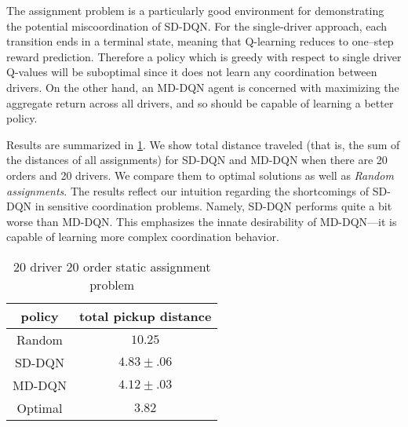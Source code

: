 The assignment problem is a particularly good environment for demonstrating the potential miscoordination of SD-DQN. For the single-driver approach, each transition ends in a terminal state, meaning that Q-learning reduces to one--step reward prediction. Therefore a policy which is greedy with respect to single driver Q-values will be suboptimal since it does not learn any coordination between drivers. On the other hand, an MD-DQN agent is concerned with maximizing the aggregate return across all drivers, and so should be capable of learning a better policy.
% 
% 

Results are summarized in \cref{KM}. We show total distance traveled (that is, the sum of the distances of all assignments) for SD-DQN and MD-DQN when there are 20 orders and 20 drivers. We compare them to optimal solutions as well as {\em Random assignments}. The results reflect our intuition regarding the shortcomings of SD-DQN in sensitive coordination problems. Namely, SD-DQN performs quite a bit worse than MD-DQN. This emphasizes the innate desirability of MD-DQN---it is capable of learning more complex coordination behavior.

\begin{center}
\begin{table}
\caption{20 driver 20 order static assignment problem}
 \begin{tabular}{||c c||} 
 \hline
 policy &  total pickup distance\\ [0.5ex] 
 \hline\hline
 Random & $10.25$  \\ 
 \hline
 SD-DQN &  $4.83 \pm .06$ \\
  \hline
  MD-DQN &  $4.12 \pm .03$  \\
 \hline
 Optimal  & $3.82$ \\ [1ex]
 \hline
\end{tabular}
\label{KM}
\end{table}
\end{center}

